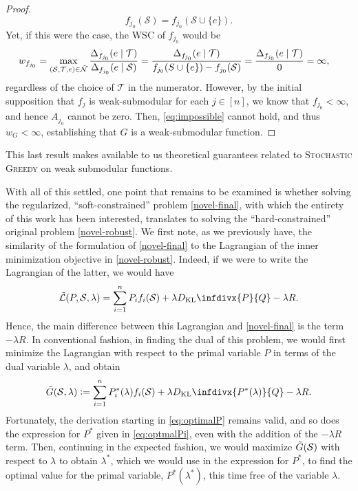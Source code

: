 \documentclass[letter,11pt]{article}
\newcommand{\infdiv}{D_{\text{KL}}\infdivx}
\def\sS{\mathcal{S}}
\def\sN{\mathcal{N}}
\def\sT{\mathcal{T}}
\begin{document}
\begin{proof}
\begin{equation}
f_{j_0}(\sS) = f_{j_0}(\sS \cup \{e\}).
\end{equation}
Yet, if this were the case, the WSC of $f_{j_0}$ would be
\begin{equation}
\begin{split}
w_{f_{j_0}} &= \max_{(\sS, \sT, e) \in \Tilde{\sN}} \dfrac{\Delta_{f_{j_0}}(e \mid \sT)}{\Delta_{f_{j_0}}(e\mid \sS)} = \dfrac{\Delta_{f_{j_0}}(e \mid \sT)}{f_{j_0}(S \cup \{e\}) - f_{j_0}(\sS)} = \dfrac{\Delta_{f_{j_0}}(e \mid \sT)}{0}= \infty,
\end{split}
\end{equation}
regardless of the choice of $\sT$ in the numerator. However, by the initial supposition that $f_j$ is weak-submodular for each $j \in [n]$, we know that $f_{j_0} < \infty$, and hence $A_{j_0}$ cannot be zero. Then, \eqref{eq:impossible} cannot hold, and thus $w_G < \infty$, establishing that $G$ is a weak-submodular function.
\end{proof}
This last result makes available to us theoretical guarantees related to \textsc{Stochastic Greedy} on weak submodular functions\cite{hibbard_hashemi_tanaka_topcu_2023, kaya2024randomizedgreedymethodsweak}.

With all of this settled, one point that remains to be examined is whether solving the regularized, ``soft-constrained'' problem \eqref{novel-final}, with which the entirety of this work has been interested, translates to solving the ``hard-constrained'' original problem \eqref{novel-robust}. We first note, as we previously have, the similarity of the formulation of \eqref{novel-final} to the Lagrangian of the inner minimization objective in \eqref{novel-robust}. Indeed, if we were to write the Lagrangian of the latter, we would have
\begin{equation}\label{eq:trueLagrange}
\Tilde{\mathcal{L}}(P, \sS, \lambda) = \sum^n_{i=1} P_i f_i(\sS) + \lambda\infdiv{P}{Q} -\lambda  R.
\end{equation}
Hence, the main difference between this Lagrangian and \eqref{novel-final} is the term $-\lambda R$. In conventional fashion, in finding the dual of this problem, we would first minimize the Lagrangian with respect to the primal variable $P$ in terms of the dual variable $\lambda$, and obtain
\begin{equation}
\Tilde{G}(\sS, \lambda) \vcentcolon= \sum^n_{i=1} P^\ast_i(\lambda) f_i(\sS) + \lambda\infdiv{P^\ast(\lambda)}{Q} -\lambda  R.
\end{equation}
Fortunately, the derivation starting in \eqref{eq:optimalP} remains valid, and so does the expression for $P^\ast$ given in \eqref{eq:optmalPi}, even with the addition of the $-\lambda R$ term. Then, continuing in the expected fashion, we would maximize $\Tilde{G}(\sS)$ with respect to $\lambda$ to obtain $\lambda^\ast$, which we would use in the expression for $P^\ast$, to find the optimal value for the primal variable, $P^\ast(\lambda^\ast)$, this time free of the variable $\lambda$. 
\end{document}
